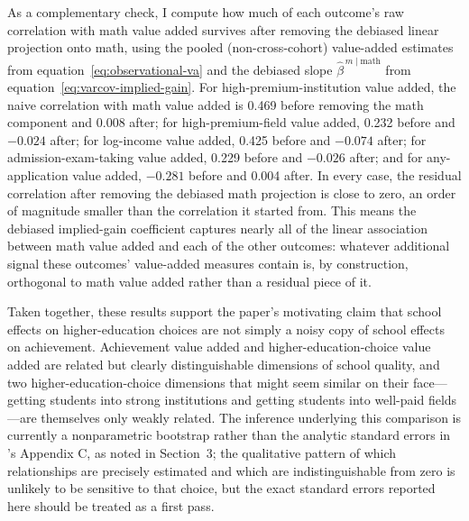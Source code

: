 \documentclass[a4paper, article, english, oneside, unknownkeysallowed, 12pt]{memoir}
\begin{document}
As a complementary check, I compute how much of each outcome's raw correlation with math value added survives after removing the debiased linear projection onto math, using the pooled (non-cross-cohort) value-added estimates from equation~\eqref{eq:observational-va} and the debiased slope $\widehat\beta^{\,m\mid \text{math}}$ from equation~\eqref{eq:varcov-implied-gain}.
For high-premium-institution value added, the naive correlation with math value added is 0.469 before removing the math component and 0.008 after; for high-premium-field value added, 0.232 before and $-0.024$ after; for log-income value added, 0.425 before and $-0.074$ after; for admission-exam-taking value added, 0.229 before and $-0.026$ after; and for any-application value added, $-0.281$ before and 0.004 after.
In every case, the residual correlation after removing the debiased math projection is close to zero, an order of magnitude smaller than the correlation it started from.
This means the debiased implied-gain coefficient captures nearly all of the linear association between math value added and each of the other outcomes: whatever additional signal these outcomes' value-added measures contain is, by construction, orthogonal to math value added rather than a residual piece of it.

Taken together, these results support the paper's motivating claim that school effects on higher-education choices are not simply a noisy copy of school effects on achievement.
Achievement value added and higher-education-choice value added are related but clearly distinguishable dimensions of school quality, and two higher-education-choice dimensions that might seem similar on their face---getting students into strong institutions and getting students into well-paid fields---are themselves only weakly related.
The inference underlying this comparison is currently a nonparametric bootstrap rather than the analytic standard errors in \textcite{rose_effects_2022}'s Appendix C, as noted in Section~3; the qualitative pattern of which relationships are precisely estimated and which are indistinguishable from zero is unlikely to be sensitive to that choice, but the exact standard errors reported here should be treated as a first pass.


\end{document}
